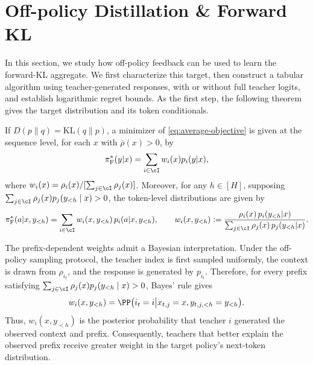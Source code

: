 \documentclass[11pt]{article}
\newcommand{\KL}{\text{KL}}
\newcommand{\pif}{\pi_{\mathrm{F}}}
\begin{document}
\section{Off-policy Distillation \& Forward KL}
\label{sec:ar-fkl-tabular}
In this section, we study how off-policy feedback can be used to learn the forward-KL aggregate. We first characterize this target, then construct a tabular algorithm using teacher-generated responses, with or without full teacher logits, and establish logarithmic regret bounds. As the first step, the following theorem gives the target distribution and its token conditionals.
\begin{theorem}[Forward KL] 
\label{thm:obj-forward-kl}
If $D(p\|q) = \KL(q\|p)$, a minimizer of \eqref{eq:average-objective} is given at the sequence level, for each $x$ with $\bar\rho(x)>0$, by
\begin{align}
\label{eq:seq-fkl}
\pif^*(y|x) = \sum_{i \in \cI} w_i(x) p_i(y|x),
\end{align}
where $w_i(x) = \rho_i(x)/[\sum_{j \in \cI} \rho_j(x)]$. Moreover, for any $h \in [H]$, supposing $\sum_{j\in\cI}\rho_j(x)p_j(y_{<h}\mid x)>0$, the token-level distributions are given by
    \begin{align}
    \label{eq:ar-fkl}
        \pif^*(a|x,y_{<h}) = \sum_{i \in \cI} w_i(x,y_{<h})\, p_i(a|x,y_{<h}), \qquad w_i(x,y_{<h}) := \frac{\rho_i(x)\, p_i(y_{<h}|x)}{\sum_{j \in \cI} \rho_j(x)\, p_j(y_{<h}|x)}.
    \end{align}
\end{theorem}
\begin{remark}
The prefix-dependent weights admit a Bayesian interpretation. Under the
off-policy sampling protocol, the teacher index is first sampled uniformly,
the context is drawn from $\rho_{i_t}$, and the response is generated by
$p_{i_t}$. Therefore, for every prefix satisfying
$\sum_{j\in\cI}\rho_j(x)p_j(y_{<h}\mid x)>0$, Bayes' rule gives
\begin{align}
\notag
    w_i(x,y_{<h})
    =
    \PP\big(
        i_t=i
        \big|
        x_{t,j}=x,
        y_{t,j,<h}=y_{<h}
    \big).
\end{align}
Thus, $w_i(x,y_{<h})$ is the posterior probability that teacher $i$
generated the observed context and prefix. Consequently, teachers that better explain the observed prefix receive greater weight in the target policy's next-token distribution.
\end{remark}
\end{document}
